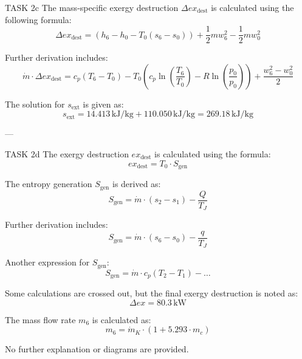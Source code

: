 TASK 2c  
The mass-specific exergy destruction \( \Delta ex_{\text{dest}} \) is calculated using the following formula:  
\[
\Delta ex_{\text{dest}} = (h_6 - h_0 - T_0(s_6 - s_0)) + \frac{1}{2} m w_6^2 - \frac{1}{2} m w_0^2
\]  

Further derivation includes:  
\[
\dot{m} \cdot \Delta ex_{\text{dest}} = c_p(T_6 - T_0) - T_0 \left( c_p \ln \left( \frac{T_6}{T_0} \right) - R \ln \left( \frac{p_0}{p_0} \right) \right) + \frac{w_6^2 - w_0^2}{2}
\]  

The solution for \( s_{\text{ext}} \) is given as:  
\[
s_{\text{ext}} = 14.413 \, \text{kJ/kg} + 110.050 \, \text{kJ/kg} = 269.18 \, \text{kJ/kg}
\]  

---

TASK 2d  
The exergy destruction \( ex_{\text{dest}} \) is calculated using the formula:  
\[
ex_{\text{dest}} = T_0 \cdot S_{\text{gen}}
\]  

The entropy generation \( S_{\text{gen}} \) is derived as:  
\[
S_{\text{gen}} = \dot{m} \cdot (s_2 - s_1) - \frac{Q}{T_J}
\]  

Further derivation includes:  
\[
S_{\text{gen}} = \dot{m} \cdot (s_6 - s_0) - \frac{q}{T_J}
\]  

Another expression for \( S_{\text{gen}} \):  
\[
S_{\text{gen}} = \dot{m} \cdot c_p(T_2 - T_1) - \dots
\]  

Some calculations are crossed out, but the final exergy destruction is noted as:  
\[
\Delta ex = 80.3 \, \text{kW}
\]  

The mass flow rate \( m_6 \) is calculated as:  
\[
m_6 = \dot{m}_K \cdot (1 + 5.293 \cdot m_c)
\]  

No further explanation or diagrams are provided.  


